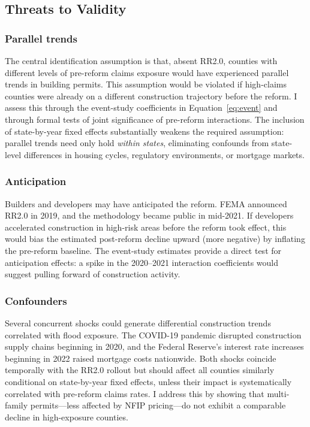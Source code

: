 \documentclass[12pt]{article}
\begin{document}
\subsection{Threats to Validity}

\subsubsection*{Parallel trends} The central identification assumption is that, absent RR2.0, counties with different levels of pre-reform claims exposure would have experienced parallel trends in building permits. This assumption would be violated if high-claims counties were already on a different construction trajectory before the reform. I assess this through the event-study coefficients in Equation~\ref{eq:event} and through formal tests of joint significance of pre-reform interactions. The inclusion of state-by-year fixed effects substantially weakens the required assumption: parallel trends need only hold \textit{within states}, eliminating confounds from state-level differences in housing cycles, regulatory environments, or mortgage markets.

\subsubsection*{Anticipation} Builders and developers may have anticipated the reform. FEMA announced RR2.0 in 2019, and the methodology became public in mid-2021. If developers accelerated construction in high-risk areas before the reform took effect, this would bias the estimated post-reform decline upward (more negative) by inflating the pre-reform baseline. The event-study estimates provide a direct test for anticipation effects: a spike in the 2020--2021 interaction coefficients would suggest pulling forward of construction activity.

\subsubsection*{Confounders} Several concurrent shocks could generate differential construction trends correlated with flood exposure. The COVID-19 pandemic disrupted construction supply chains beginning in 2020, and the Federal Reserve's interest rate increases beginning in 2022 raised mortgage costs nationwide. Both shocks coincide temporally with the RR2.0 rollout but should affect all counties similarly conditional on state-by-year fixed effects, unless their impact is systematically correlated with pre-reform claims rates. I address this by showing that multi-family permits---less affected by NFIP pricing---do not exhibit a comparable decline in high-exposure counties.
\end{document}
